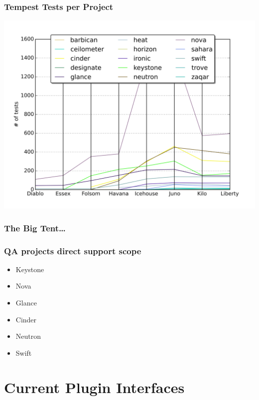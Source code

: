 \documentclass[aspectratio=169,11pt,hyperref={colorlinks=true}]{beamer}
\begin{document}
\begin{frame}
    \frametitle{Tempest Tests per Project}
    \includegraphics[width=.8\textwidth]{tests_per_proj.png}
\end{frame}

\begin{frame}
    \frametitle{The Big Tent\ldots}

\end{frame}

\begin{frame}
    \frametitle{QA projects direct support scope}
    \begin{itemize}
        \item Keystone
        \item Nova
        \item Glance
        \item Cinder
        \item Neutron
        \item Swift
    \end{itemize}
\end{frame}

\section{Current Plugin Interfaces}
\end{document}
